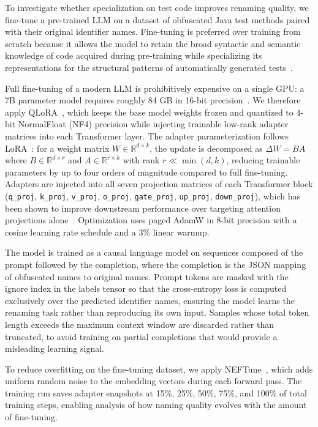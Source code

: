 \documentclass[conference]{IEEEtran}
\begin{document}
To investigate whether specialization on test code improves renaming quality,
we fine-tune a pre-trained LLM on a dataset of obfuscated Java test methods
paired with their original identifier names.
Fine-tuning is preferred over training from scratch because it allows the model
to retain the broad syntactic and semantic knowledge of code acquired during
pre-training while specializing its representations for the structural patterns
of automatically generated tests~\cite{hosna2022transfer,church2021finetuning}.

Full fine-tuning of a modern LLM is prohibitively expensive on a single GPU: a
7B parameter model requires roughly 84 GB in 16-bit
precision~\cite{dettmers2023qlora}.
We therefore apply QLoRA~\cite{dettmers2023qlora}, which keeps the base model
weights frozen and quantized to 4-bit NormalFloat (NF4) precision while
injecting trainable low-rank adapter matrices into each Transformer layer.
The adapter parameterization follows LoRA~\cite{hu2022lora}: for a weight
matrix $W \in \mathbb{R}^{d \times k}$, the update is decomposed as
$\Delta W = BA$ where $B \in \mathbb{R}^{d \times r}$ and
$A \in \mathbb{R}^{r \times k}$ with rank $r \ll \min(d,k)$, reducing
trainable parameters by up to four orders of magnitude compared to full
fine-tuning.
Adapters are injected into all seven projection matrices of each Transformer
block (\texttt{q\_proj}, \texttt{k\_proj}, \texttt{v\_proj}, \texttt{o\_proj},
\texttt{gate\_proj}, \texttt{up\_proj}, \texttt{down\_proj}), which has been
shown to improve downstream performance over targeting attention projections
alone~\cite{hu2022lora}.
Optimization uses paged AdamW in 8-bit precision with a cosine learning rate
schedule and a 3\% linear warmup.

The model is trained as a causal language model on sequences composed of the
prompt followed by the completion, where the completion is the JSON mapping of
obfuscated names to original names.
Prompt tokens are masked with the ignore index in the labels tensor so that the
cross-entropy loss is computed exclusively over the predicted identifier names,
ensuring the model learns the renaming task rather than reproducing its own input.
Samples whose total token length exceeds the maximum context window are discarded
rather than truncated, to avoid training on partial completions that would
provide a misleading learning signal.

To reduce overfitting on the fine-tuning dataset, we apply
NEFTune~\cite{jain2024neftune}, which adds uniform random noise to the embedding
vectors during each forward pass.
The training run saves adapter snapshots at 15\%, 25\%, 50\%, 75\%, and 100\%
of total training steps, enabling analysis of how naming quality evolves with
the amount of fine-tuning.
\end{document}
